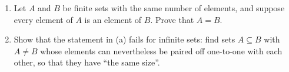 \begin{enumerate}
\item[(a)] Let $A$ and $B$ be finite sets with the same number of elements, and suppose every element of $A$ is an element of $B$. Prove that $A=B$.
\item[(b)] Show that the statement in (a) fails for infinite sets: find sets $A\subseteq B$ with $A\ne B$ whose elements can nevertheless be paired off one-to-one with each other, so that they have ``the same size''.
\end{enumerate}

